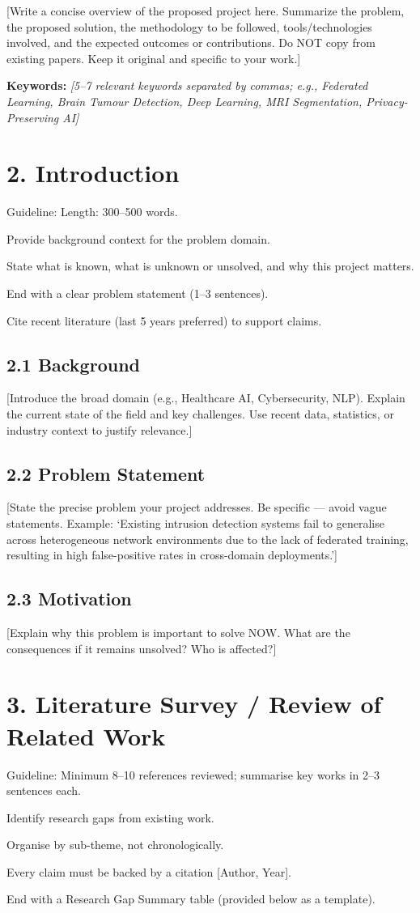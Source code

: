 \documentclass[12pt,a4paper]{article}
\newcommand{\redsec}[1]{\section*{\color{dred}#1}\vspace{-4pt}}
\newcommand{\purpsec}[1]{\section*{\color{purp}#1}}
\newcommand{\dredrule}{\noindent{\color{dred}\rule{\linewidth}{0.5pt}}\par\vspace{4pt}}
\newcommand{\navysub}[1]{\subsection*{\color{navy}#1}}
\begin{document}
[Write a concise overview of the proposed project here. Summarize the problem, the proposed solution, the methodology to be followed, tools/technologies involved, and the expected outcomes or contributions. Do NOT copy from existing papers. Keep it original and specific to your work.]

\textbf{Keywords:} {\itshape\color{gtext}[5--7 relevant keywords separated by commas; e.g., Federated Learning, Brain Tumour Detection, Deep Learning, MRI Segmentation, Privacy-Preserving AI]}

\purpsec{2. Introduction}
\begin{guide}{Guideline:}
Length: 300--500 words.\par
Provide background context for the problem domain.\par
State what is known, what is unknown or unsolved, and why this project matters.\par
End with a clear problem statement (1--3 sentences).\par
Cite recent literature (last 5 years preferred) to support claims.
\end{guide}

\navysub{2.1 Background}
[Introduce the broad domain (e.g., Healthcare AI, Cybersecurity, NLP). Explain the current state of the field and key challenges. Use recent data, statistics, or industry context to justify relevance.]

\navysub{2.2 Problem Statement}
[State the precise problem your project addresses. Be specific --- avoid vague statements. Example: `Existing intrusion detection systems fail to generalise across heterogeneous network environments due to the lack of federated training, resulting in high false-positive rates in cross-domain deployments.']

\navysub{2.3 Motivation}
[Explain why this problem is important to solve NOW. What are the consequences if it remains unsolved? Who is affected?]

\redsec{3. Literature Survey / Review of Related Work}
\dredrule
\begin{guide}{Guideline:}
Minimum 8--10 references reviewed; summarise key works in 2--3 sentences each.\par
Identify research gaps from existing work.\par
Organise by sub-theme, not chronologically.\par
Every claim must be backed by a citation [Author, Year].\par
End with a Research Gap Summary table (provided below as a template).
\end{guide}
\end{document}
